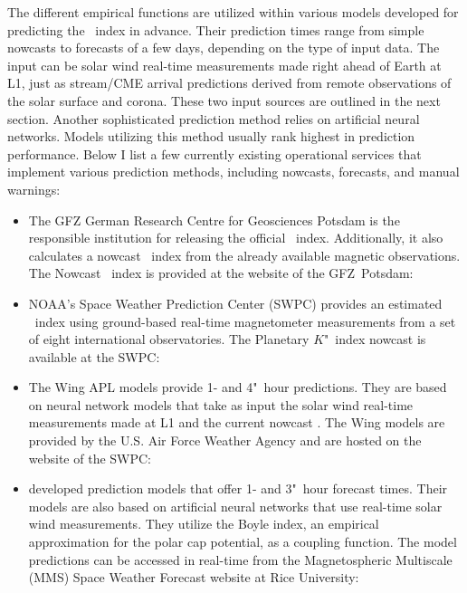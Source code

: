 The different empirical functions are utilized within various models developed for predicting the \Kp~index in advance. Their prediction times range from simple nowcasts to forecasts of a few days, depending on the type of input data. The input can be solar wind real-time measurements made right ahead of Earth at L1, just as stream/CME arrival predictions derived from remote observations of the solar surface and corona. These two input sources are outlined in the next section.
Another sophisticated prediction method relies on artificial neural networks. Models utilizing this method usually rank highest in prediction performance.
Below I list a few currently existing operational services that implement various \Kp{} prediction methods, including nowcasts, forecasts, and manual warnings:
\begin{itemize}
	\item The GFZ German Research Centre for Geosciences Potsdam is the responsible institution for releasing the official \Kp{}~index. Additionally, it also calculates a nowcast \Kp~index from the already available magnetic observations. The Nowcast \Kp~index is provided at the website of the GFZ~Potsdam:\\
	
	\item NOAA's Space Weather Prediction Center (SWPC) provides an estimated \Kp~index using ground-based real-time magnetometer measurements from a set of eight international observatories. The Planetary $K$"~index nowcast is available at the SWPC:\\
	
	\item The Wing APL models provide 1- and 4"~hour \Kp{} predictions. They are based on neural network models that take as input the solar wind real-time measurements made at L1 and the current \Kp{} nowcast \citep{Wing2005}. The Wing \Kp{} models are provided by the U.S. Air Force Weather Agency and are hosted on the website of the SWPC:\\
	
	\item \citet{Bala2012} developed \Kp{} prediction models that offer 1- and 3"~hour forecast times. Their models are also based on artificial neural networks that use real-time solar wind measurements. They utilize the Boyle index, an empirical approximation for the polar cap potential, as a coupling function. The model predictions can be accessed in real-time from the Magnetospheric Multiscale (MMS) Space Weather Forecast website at Rice University:\\
	

\end{itemize}
